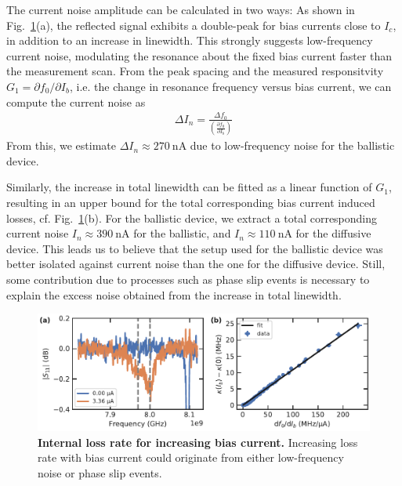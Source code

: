 The current noise amplitude can be calculated in two ways:
%
As shown in Fig.~\ref{fig:SMFig-lossrates-current}(a), the reflected signal exhibits a double-peak for bias currents close to $I_c$, in addition to an increase in linewidth.
%
This strongly suggests low-frequency current noise, modulating the resonance about the fixed bias current faster than the measurement scan.
%
From the peak spacing and the measured responsitvity $G_1=\partial f_0/\partial I_b$, i.e. the change in resonance frequency versus bias current, we can compute the current noise as
\begin{align}
\Delta I_n = \frac{\Delta f_0}{\left( \frac{\partial f_0}{\partial I_b} \right)}
\label{eq:currnoise-a}
\end{align}
%
From this, we estimate $\Delta I_n\approx\SI{270}{\nano\ampere}$ due to low-frequency noise for the ballistic device.


Similarly, the increase in total linewidth can be fitted as a linear function of $G_1$, resulting in an upper bound for the total corresponding bias current induced losses, cf. Fig.~\ref{fig:SMFig-lossrates-current}(b).
%
For the ballistic device, we extract a total corresponding current noise $I_n\approx\SI{390}{\nano\ampere}$ for the ballistic, and $I_n\approx\SI{110}{\nano\ampere}$ for the diffusive device.
%
This leads us to believe that the setup used for the ballistic device was better isolated against current noise than the one for the diffusive device.
%
Still, some contribution due to processes such as phase slip events is necessary to explain the excess noise obtained from the increase in total linewidth.

\begin{figure}
	\centering
	\includegraphics[width=\linewidth]{chapter-gJJ-CPR/figs/SMFigure-lossrates-current}
	\caption{
		\textbf{Internal loss rate for increasing bias current.}
		Increasing loss rate with bias current could originate from either low-frequency noise or phase slip events.
	}
	\label{fig:SMFig-lossrates-current}
\end{figure}

